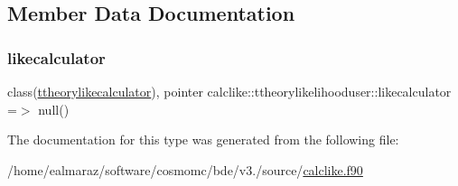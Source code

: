 \subsection{Member Data Documentation}
\mbox{\label{structcalclike_1_1ttheorylikelihooduser_a048eb30d08fb48e7f01ac21b888d6dbf}} 
\subsubsection{\texorpdfstring{likecalculator}{likecalculator}}
{\footnotesize\ttfamily class(\mbox{\hyperlink{structcalclike_1_1ttheorylikecalculator}{ttheorylikecalculator}}), pointer calclike\+::ttheorylikelihooduser\+::likecalculator =$>$ null()\hspace{0.3cm}{\ttfamily [private]}}



The documentation for this type was generated from the following file\+:\begin{DoxyCompactItemize}
\item 
/home/ealmaraz/software/cosmomc/bde/v3./source/\mbox{\hyperlink{calclike_8f90}{calclike.\+f90}}\end{DoxyCompactItemize}
